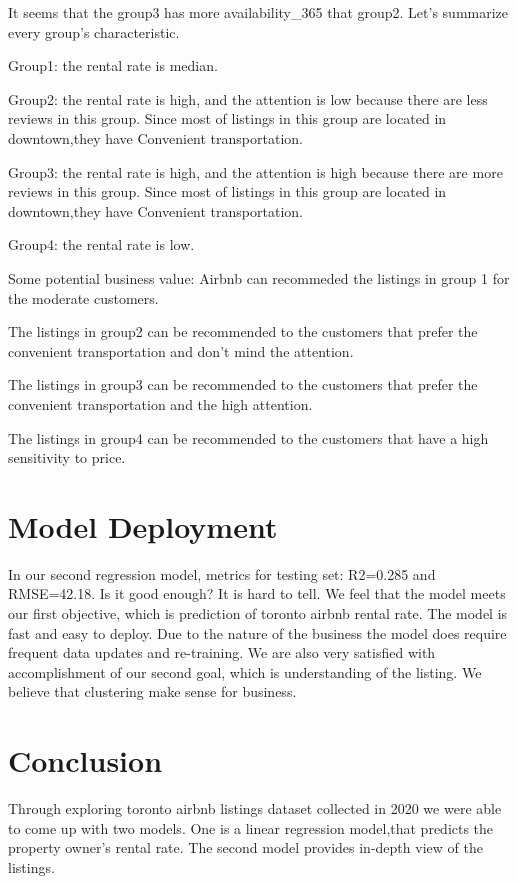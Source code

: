 It seems that the group3 has more availability\_365 that group2. Let's
summarize every group's characteristic.

Group1: the rental rate is median.

Group2: the rental rate is high, and the attention is low because there
are less reviews in this group. Since most of listings in this group are
located in downtown,they have Convenient transportation.

Group3: the rental rate is high, and the attention is high because there
are more reviews in this group. Since most of listings in this group are
located in downtown,they have Convenient transportation.

Group4: the rental rate is low.

Some potential business value: Airbnb can recommeded the listings in
group 1 for the moderate customers.

The listings in group2 can be recommended to the customers that prefer
the convenient transportation and don't mind the attention.

The listings in group3 can be recommended to the customers that prefer
the convenient transportation and the high attention.

The listings in group4 can be recommended to the customers that have a
high sensitivity to price.

\hypertarget{model-deployment}{%
\section{Model Deployment}\label{model-deployment}}

In our second regression model, metrics for testing set: R2=0.285 and
RMSE=42.18. Is it good enough? It is hard to tell. We feel that the
model meets our first objective, which is prediction of toronto airbnb
rental rate. The model is fast and easy to deploy. Due to the nature of
the business the model does require frequent data updates and
re-training. We are also very satisfied with accomplishment of our
second goal, which is understanding of the listing. We believe that
clustering make sense for business.

\hypertarget{conclusion}{%
\section{Conclusion}\label{conclusion}}

Through exploring toronto airbnb listings dataset collected in 2020 we
were able to come up with two models. One is a linear regression
model,that predicts the property owner's rental rate. The second model
provides in-depth view of the listings.

